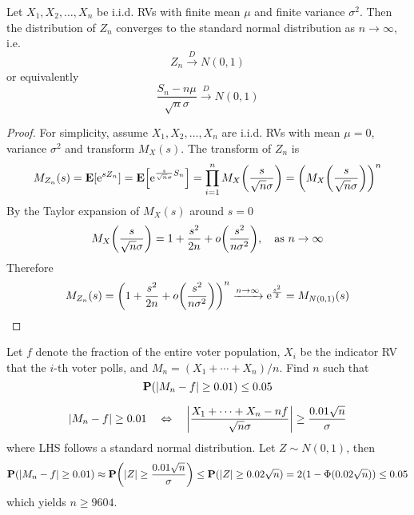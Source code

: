 \documentclass[device=normal, lang=en]{elegantbook}
\numberwithin{equation}{section}
\begin{document}
\begin{theorem}
    Let $X_1, X_2, \ldots, X_n$ be i.i.d. RVs with finite mean $\mu$ and finite variance $\sigma^2$. Then the distribution of $Z_n$ converges to the standard normal distribution as $n \to \infty$, i.e.
    \begin{equation}
        Z_n \xrightarrow{D} N(0, 1)
    \end{equation}
    or equivalently
    \begin{equation}
        \frac{S_n - n\mu}{\sqrt{n}\sigma} \xrightarrow{D} N(0, 1)
    \end{equation}
\end{theorem}
\begin{proof}
    For simplicity, assume $X_1, X_2, \ldots, X_n$ are i.i.d. RVs with mean $\mu = 0$, variance $\sigma^2$ and transform $M_X(s)$. The transform of $Z_n$ is 
    \begin{equation}
        M_{Z_n}(s) = \mathbf{E}[\mathrm{e}^{sZ_n}] = \mathbf{E}\qty[\mathrm{e}^{\frac{s}{\sqrt{n}\sigma}S_n}] = \prod_{i=1}^{n} M_X\qty(\frac{s}{\sqrt{n}\sigma}) = \qty(M_X\qty(\frac{s}{\sqrt{n}\sigma}))^n
    \end{equation}
    By the Taylor expansion of $M_X(s)$ around $s = 0$
    \begin{equation}
        M_X\qty(\frac{s}{\sqrt{n}\sigma}) = 1 + \frac{s^2}{2n} + o\qty(\frac{s^2}{n\sigma^2}), \quad \text{as } n \to \infty
    \end{equation}
    Therefore
    \begin{equation}
        M_{Z_n}(s) = \qty(1 + \frac{s^2}{2n} + o\qty(\frac{s^2}{n\sigma^2}))^n \xrightarrow{n \to \infty} \mathrm{e}^{\frac{s^2}{2}} = M_{N(0, 1)}(s)
    \end{equation}
\end{proof}

\begin{example}
    Let $f$ denote the fraction of the entire voter population, $X_i$ be the indicator RV that the $i$-th voter polls, and $M_n = (X_1 + \cdots + X_n) / n$. Find $n$ such that
    \begin{equation}
        \mathbf{P}(\abs{M_n - f} \geq 0.01) \leq 0.05
    \end{equation}
\end{example}
\begin{solution}
    \begin{equation}
        \abs{M_n - f} \geq 0.01 \quad\Leftrightarrow\quad \abs{\frac{X_1 + \cdots + X_n - nf}{\sqrt{n}\sigma}} \geq \frac{0.01 \sqrt{n}}{\sigma}
    \end{equation}
    where LHS follows a standard normal distribution. Let $Z \sim N(0, 1)$, then
    \begin{equation}
        \mathbf{P}(\abs{M_n - f} \geq 0.01) \approx \mathbf{P}\qty(\abs{Z} \geq \frac{0.01 \sqrt{n}}{\sigma}) \leq \mathbf{P}(\abs{Z} \geq 0.02\sqrt{n}) = 2(1 - \Phi(0.02\sqrt{n})) \leq 0.05
    \end{equation}
    which yields $n \geq 9604$.
\end{solution}
\end{document}
